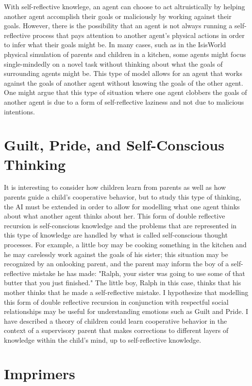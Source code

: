 With self-reflective knowlege, an agent can choose to act
altruistically by helping another agent accomplish their goals or
maliciously by working against their goals. However, there is the
possibility that an agent is not always running a self-reflective
process that pays attention to another agent's physical actions in
order to infer what their goals might be. In many cases, such as in
the IsisWorld physical simulation of parents and children in a
kitchen, some agents might focus single-mindedly on a novel task
without thinking about what the goals of surrounding agents might
be. This type of model allows for an agent that works against the
goals of another agent without knowing the goals of the other
agent. One might argue that this type of situation where one agent
clobbers the goals of another agent is due to a form of
self-reflective laziness and not due to malicious intentions.

\section{Guilt, Pride, and Self-Conscious Thinking}

It is interesting to consider how children learn from parents as well
as how parents guide a child's cooperative behavior, but to study this
type of thinking, the AI must be extended in order to allow for
modelling what one agent thinks about what another agent thinks about
her.  This form of double reflective recursion is self-conscious
knowledge and the problems that are represented in this type of
knowledge are handled by what is called self-conscious thought
processes. For example, a little boy may be cooking something in the
kitchen and he may carelessly work against the goals of his sister;
this situation may be recognized by an onlooking parent, and the
parent may inform the boy of a self-reflective mistake he has made:
"Ralph, your sister was going to use some of that butter that you just
finished." The little boy, Ralph in this case, thinks that his mother
thinks that he made a self-reflective mistake. I hypothesize that
modelling this form of double reflective recursion in conjunction with
respectful social relationships may be useful for understanding
emotions such as Guilt and Pride.  I have described
\cite[]{morgan:2010} a theory of children could learn cooperative
behavior in the context of a supervisory parent that makes corrections
to different layers of knowledge within the child's mind, up to
self-reflective knowledge.

\section{Imprimers}

